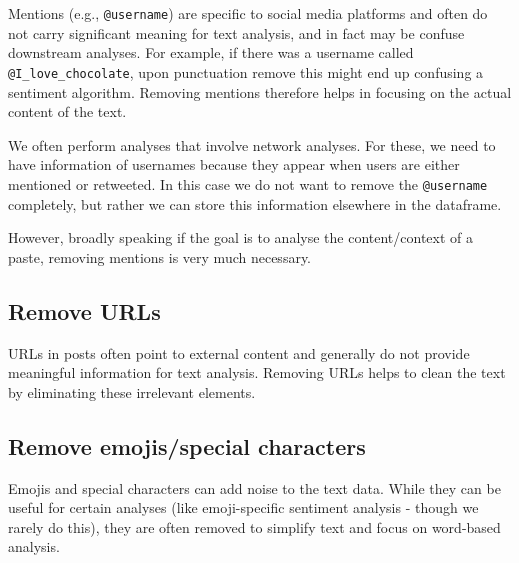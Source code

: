 \documentclass[
  letterpaper,
  DIV=11,
  numbers=noendperiod]{scrreprt}
\begin{document}
Mentions (e.g., \texttt{@username}) are specific to social media
platforms and often do not carry significant meaning for text analysis,
and in fact may be confuse downstream analyses. For example, if there
was a username called \texttt{@I\_love\_chocolate}, upon punctuation
remove this might end up confusing a sentiment algorithm. Removing
mentions therefore helps in focusing on the actual content of the text.

\begin{tcolorbox}[enhanced jigsaw, colback=white, opacitybacktitle=0.6, coltitle=black, left=2mm, breakable, bottomtitle=1mm, toptitle=1mm, toprule=.15mm, colframe=quarto-callout-tip-color-frame, titlerule=0mm, title=\textcolor{quarto-callout-tip-color}{\faLightbulb}\hspace{0.5em}{Retaining mentions, sometimes}, colbacktitle=quarto-callout-tip-color!10!white, rightrule=.15mm, bottomrule=.15mm, arc=.35mm, opacityback=0, leftrule=.75mm]

We often perform analyses that involve network analyses. For these, we
need to have information of usernames because they appear when users are
either mentioned or retweeted. In this case we do not want to remove the
\texttt{@username} completely, but rather we can store this information
elsewhere in the dataframe.

However, broadly speaking if the goal is to analyse the content/context
of a paste, removing mentions is very much necessary.

\end{tcolorbox}

\subsection{Remove URLs}\label{remove-urls}

URLs in posts often point to external content and generally do not
provide meaningful information for text analysis. Removing URLs helps to
clean the text by eliminating these irrelevant elements.

\subsection{Remove emojis/special
characters}\label{remove-emojisspecial-characters}

Emojis and special characters can add noise to the text data. While they
can be useful for certain analyses (like emoji-specific sentiment
analysis - though we rarely do this), they are often removed to simplify
text and focus on word-based analysis.
\end{document}
